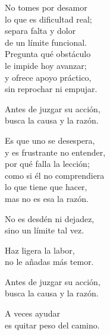 \begin{lyrics}
No tomes por desamor\\
lo que es dificultad real;\\
separa falta y dolor\\
de un límite funcional.\\
Pregunta qué obstáculo\\
le impide hoy avanzar;\\
y ofrece apoyo práctico,\\
sin reprochar ni empujar.


Antes de juzgar su acción,\\
busca la causa y la razón.


Es que uno se desespera,\\
y es frustrante no entender,\\
por qué falla la lección;\\
como si él no comprendiera\\
lo que tiene que hacer,\\
mas no es esa la razón.


No es desdén ni dejadez,\\
sino un límite tal vez.

Haz ligera la labor,\\
no le añadas más temor.

Antes de juzgar su acción,\\
busca la causa y la razón.


A veces ayudar\\
es quitar peso del camino.

\end{lyrics}

